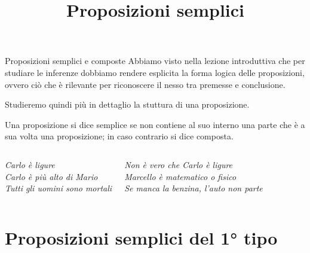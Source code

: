\documentclass[aspectratio=169,10pt,dvipsnames,handout]{beamer}
\title{Proposizioni semplici}
\begin{document}
\begin{frame}
\titlepage
\end{frame}

\begin{frame}{Proposizioni semplici e composte}
Abbiamo visto nella lezione introduttiva che per studiare le inferenze dobbiamo rendere esplicita la \alert{forma logica} delle proposizioni, ovvero ciò che è rilevante per riconoscere il nesso tra premesse e conclusione.

\medskip Studieremo quindi più in dettaglio la stuttura di una proposizione.

\pause
\begin{definition}
	Una proposizione si dice \alert{semplice} se non contiene al suo interno una parte che è a sua volta una proposizione; in caso contrario si dice \alert{composta}.
\end{definition}

\vspace*{-0.5cm}
\begin{columns}[t]
\begin{example}
	\itshape
	Carlo è ligure\\
	Carlo è più alto di Mario\\
	Tutti gli uomini sono mortali
\end{example}
	\begin{example}
		\itshape
		Non è vero che Carlo è ligure\\
		Marcello è matematico o fisico\\
		Se manca la benzina, l'auto non parte
	\end{example}
\end{columns}
\end{frame}

\section{Proposizioni semplici del 1° tipo}
\end{document}
